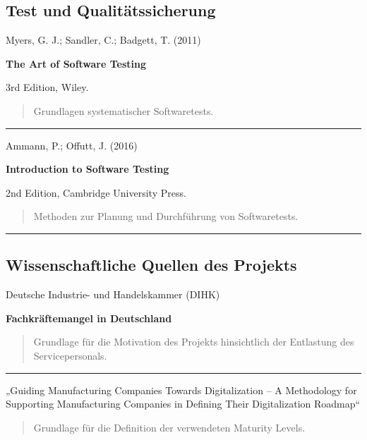 \documentclass[
  a4paper,
  12pt,
  DIV=12,        %
  parskip=half,  %
  headings=small %
]{scrartcl}
\theoremstyle{definition}
\theoremstyle{definition}
\begin{document}
\subsection{Test und
Qualitätssicherung}\label{test-und-qualituxe4tssicherung}

Myers, G. J.; Sandler, C.; Badgett, T. (2011)

\textbf{The Art of Software Testing}

3rd Edition, Wiley.

\begin{quote}
Grundlagen systematischer Softwaretests.
\end{quote}

\begin{center}\rule{0.5\linewidth}{0.5pt}\end{center}

Ammann, P.; Offutt, J. (2016)

\textbf{Introduction to Software Testing}

2nd Edition, Cambridge University Press.

\begin{quote}
Methoden zur Planung und Durchführung von Softwaretests.
\end{quote}

\begin{center}\rule{0.5\linewidth}{0.5pt}\end{center}

\subsection{Wissenschaftliche Quellen des
Projekts}\label{wissenschaftliche-quellen-des-projekts}

Deutsche Industrie- und Handelskammer (DIHK)

\textbf{Fachkräftemangel in Deutschland}

\begin{quote}
Grundlage für die Motivation des Projekts hinsichtlich der Entlastung
des Servicepersonals.
\end{quote}

\begin{center}\rule{0.5\linewidth}{0.5pt}\end{center}

„Guiding Manufacturing Companies Towards Digitalization -- A Methodology
for Supporting Manufacturing Companies in Defining Their Digitalization
Roadmap``

\begin{quote}
Grundlage für die Definition der verwendeten Maturity Levels.
\end{quote}
\end{document}
